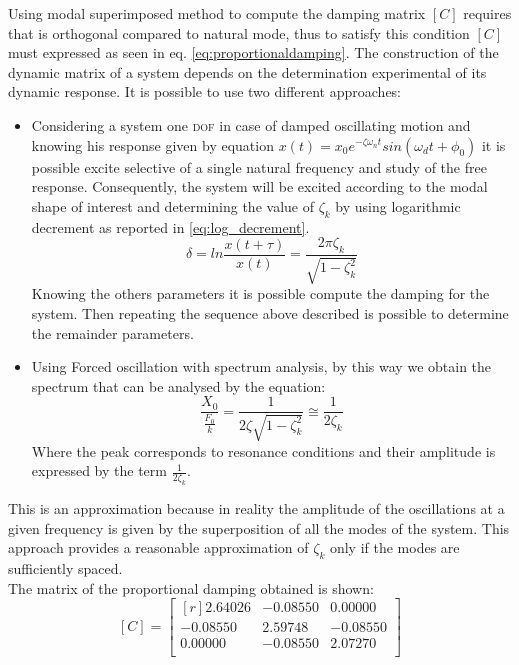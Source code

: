 Using modal superimposed method to compute the damping matrix \([C]\) requires 
that is orthogonal compared to natural mode, thus to satisfy this condition 
\([C]\) must expressed as seen in eq. \eqref{eq:proportionaldamping}.
The construction of the dynamic matrix of a system depends on the 
determination experimental of its dynamic response.
It is possible to use two different approaches:
\begin{itemize}
\item Considering a system one \textsc{dof} in case of damped oscillating 
motion and knowing his response given by equation
\(x(t) = x_{0} e^{-\zeta\omega_{n}t}sin(\omega_dt+\phi_0)\) it is possible excite 
selective of a single natural frequency and study of the free response. 
Consequently, the system will be excited according to the modal shape 
of interest and determining the value of \(\zeta_{k}\) by using logarithmic 
decrement as reported 
in \eqref{eq:log_decrement}.
\begin{equation}
\label{eq:log_decrement}
\delta = ln\frac{x(t+\tau)}{x(t)} = \frac{2\pi\zeta_{k}}{\sqrt{1-\zeta_{k}^2}}
\end{equation}
Knowing the others parameters it is possible compute the damping for the system. 
Then repeating the sequence above described is possible to determine the remainder
 parameters. 
\item Using Forced oscillation with spectrum analysis, by this way we obtain 
the spectrum that can be analysed by the equation:
\begin{equation}
\label{eq:analysis_spectrum}
\frac{X_{0}}{\frac{F_{0}}{k}} = \frac{1}{2\zeta\sqrt{1-\zeta^2_{k}}} \cong \frac{1}{2\zeta_{k}}
\end{equation}
Where the peak corresponds to resonance conditions and their amplitude is 
expressed by the term \(\frac{1}{2\zeta_{k}}\).
\end{itemize}
This is an approximation because in reality the amplitude of the oscillations 
at a given frequency is given by the superposition of all the modes of the 
system. This approach provides a reasonable approximation of \(\zeta_{k}\) only 
if the modes are sufficiently spaced.\\
The matrix of the proportional damping obtained is shown:
\begin{equation}
\label{eq:c-matrix}
	[C] =
	\begin{bmatrix*}[r]
		 2.64026		&	-0.08550		 & 	 0.00000 	\\
		-0.08550 	&	 2.59748		 &	-0.08550		\\
		 0.00000 	&	-0.08550		 &	 2.07270		\\
	\end{bmatrix*}
\end{equation}
